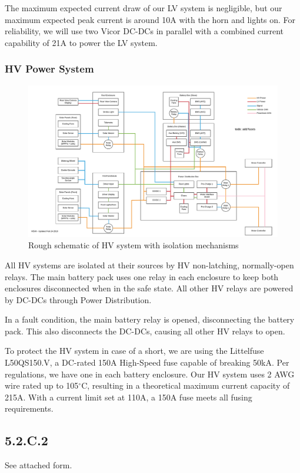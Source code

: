 \documentclass[10pt]{article}
\begin{document}
The maximum expected current draw of our LV system is negligible, but our maximum expected peak current is around 10A with the horn and lights on. For reliability, we will use two Vicor DC-DCs in parallel with a combined current capability of 21A to power the LV system.

\subsubsection{HV Power System}

\begin{figure}[H]
    \centering
    \includegraphics[width=\textwidth,page=3]{figures/msxii-block-diagrams}
    \caption{Rough schematic of HV system with isolation mechanisms}
    \label{fig:msxii-electrical-hv-system}
\end{figure}

All HV systems are isolated at their sources by HV non-latching, normally-open relays. The main battery pack uses one relay in each enclosure to keep both enclosures disconnected when in the safe state. All other HV relays are powered by DC-DCs through Power Distribution.

In a fault condition, the main battery relay is opened, disconnecting the battery pack. This also disconnects the DC-DCs, causing all other HV relays to open.

To protect the HV system in case of a short, we are using the Littelfuse L50QS150.V, a DC-rated 150A High-Speed fuse capable of breaking 50kA. Per regulations, we have one in each battery enclosure. Our HV system uses 2 AWG wire rated up to 105$^{\circ}$C, resulting in a theoretical maximum current capacity of 215A. With a current limit set at 110A, a 150A fuse meets all fusing requirements.



\subsection{5.2.C.2}

See attached form.




\pagebreak
\appendix
\end{document}
